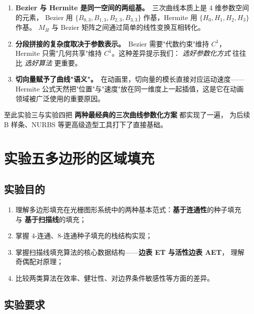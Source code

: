 \documentclass[a4paper,12pt]{ctexart}
\begin{document}
\begin{enumerate}[leftmargin=2em,itemsep=0.2em]
    \item \textbf{Bezier 与 Hermite 是同一空间的两组基。}\ 三次曲线本质上是 4 维参数空间的元素，
        Bezier 用 $\{B_{0,3},B_{1,3},B_{2,3},B_{3,3}\}$ 作基，Hermite 用 $\{H_0,H_1,H_2,H_3\}$ 作基。
        $M_H$ 与 Bezier 矩阵之间通过简单的线性变换互相转化。
    \item \textbf{分段拼接的复杂度取决于参数表示。}\ Bezier 需要"代数约束"维持 $C^1$，
        Hermite 只需"几何共享"维持 $C^1$。这种差异提示我们：
        \emph{选好参数化方式} 往往比 \emph{选好算法} 更重要。
    \item \textbf{切向量赋予了曲线"语义"。}\ 在动画里，切向量的模长直接对应运动速度——
        Hermite 公式天然把"位置"与"速度"放在同一维度上一起插值，这是它在动画领域被广泛使用的重要原因。
\end{enumerate}

至此实验三与实验四把 \textbf{两种最经典的三次曲线参数化方案} 都实现了一遍，
为后续 B 样条、NURBS 等更高级造型工具打下了直接基础。

\clearpage
\section{实验五\quad 多边形的区域填充}

\subsection{实验目的}

\begin{enumerate}[leftmargin=2em,itemsep=0.2em]
    \item 理解多边形填充在光栅图形系统中的两种基本范式：\textbf{基于连通性}的种子填充
        与 \textbf{基于扫描线}的填充；
    \item 掌握 4-连通、8-连通种子填充的栈结构实现；
    \item 掌握扫描线填充算法的核心数据结构——\textbf{边表 ET 与活性边表 AET}，
        理解奇偶配对原理；
    \item 比较两类算法在效率、健壮性、对边界条件敏感性等方面的差异。
\end{enumerate}

\subsection{实验要求}
\end{document}
